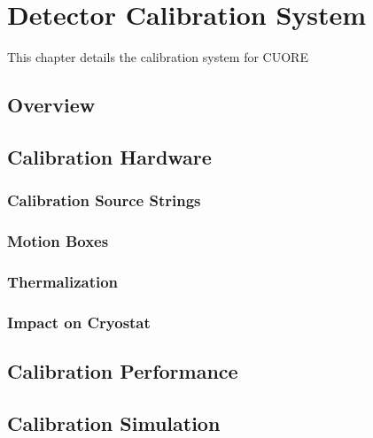 \chapter{Detector Calibration System}

This chapter details the calibration system for CUORE

\section{Overview}

\section{Calibration Hardware}

\subsection{Calibration Source Strings}

\subsection{Motion Boxes}

\subsection{Thermalization}

\subsection{Impact on Cryostat}

\section{Calibration Performance}

\section{Calibration Simulation}